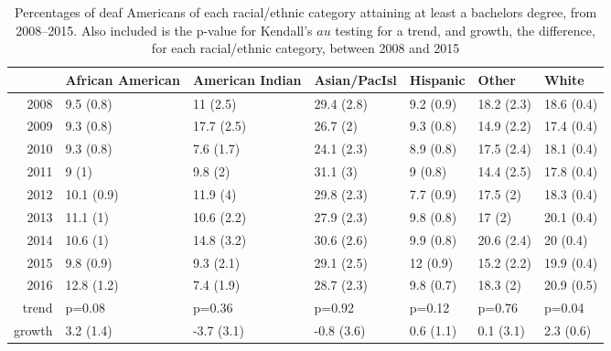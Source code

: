 \documentclass{article}\usepackage[]{graphicx}\usepackage[]{color}
\begin{document}
\begin{table}[ht]
\centering
\begin{tabular}{rllllll}
  \hline
 & African American & American Indian & Asian/PacIsl & Hispanic & Other & White \\
  \hline
2008 & 9.5 (0.8) & 11 (2.5) & 29.4 (2.8) & 9.2 (0.9) & 18.2 (2.3) & 18.6 (0.4) \\
  2009 & 9.3 (0.8) & 17.7 (2.5) & 26.7 (2) & 9.3 (0.8) & 14.9 (2.2) & 17.4 (0.4) \\
  2010 & 9.3 (0.8) & 7.6 (1.7) & 24.1 (2.3) & 8.9 (0.8) & 17.5 (2.4) & 18.1 (0.4) \\
  2011 & 9 (1) & 9.8 (2) & 31.1 (3) & 9 (0.8) & 14.4 (2.5) & 17.8 (0.4) \\
  2012 & 10.1 (0.9) & 11.9 (4) & 29.8 (2.3) & 7.7 (0.9) & 17.5 (2) & 18.3 (0.4) \\
  2013 & 11.1 (1) & 10.6 (2.2) & 27.9 (2.3) & 9.8 (0.8) & 17 (2) & 20.1 (0.4) \\
  2014 & 10.6 (1) & 14.8 (3.2) & 30.6 (2.6) & 9.9 (0.8) & 20.6 (2.4) & 20 (0.4) \\
  2015 & 9.8 (0.9) & 9.3 (2.1) & 29.1 (2.5) & 12 (0.9) & 15.2 (2.2) & 19.9 (0.4) \\
  2016 & 12.8 (1.2) & 7.4 (1.9) & 28.7 (2.3) & 9.8 (0.7) & 18.3 (2) & 20.9 (0.5) \\
  trend & p=0.08 & p=0.36 & p=0.92 & p=0.12 & p=0.76 & p=0.04 \\
  growth & 3.2 (1.4) & -3.7 (3.1) & -0.8 (3.6) & 0.6 (1.1) & 0.1 (3.1) & 2.3 (0.6) \\
   \hline
\end{tabular}
\caption{Percentages of deaf Americans of each racial/ethnic category attaining at least a bachelors degree, from 2008--2015. Also included is the p-value for Kendall's $	au$ testing for a trend, and growth, the difference, for each racial/ethnic category, between 2008 and 2015}
\label{tab:bachRaceD}
\end{table}
\end{document}
